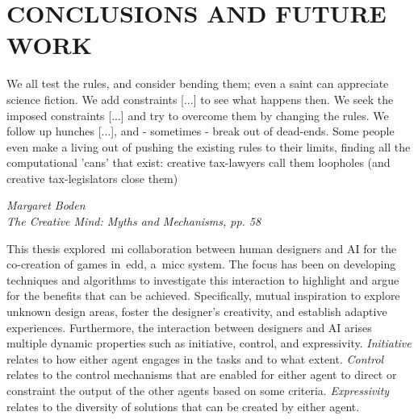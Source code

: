 \section{CONCLUSIONS AND FUTURE WORK} \normalfont


\setlength{\epigraphwidth}{4in} 
\epigraph{We all test the rules, and consider bending them; even a saint can appreciate science fiction. We add constraints [...] to see what happens then. We seek the imposed constraints [...] and try to overcome them by changing the rules. We follow up hunches [...], and - sometimes - break out of dead-ends. Some people even make a living out of pushing the existing rules to their limits, finding all the computational 'cans' that exist: creative tax-lawyers call them loopholes (and creative tax-legislators close them)}{\textit{Margaret Boden \\ The Creative Mind: Myths and Mechanisms, pp. 58}}




This thesis explored~\acrshort{mi} collaboration between human designers and AI for the co-creation of games in~\acrshort{edd}, a~\acrshort{micc} system. The focus has been on developing techniques and algorithms to investigate this interaction to highlight and argue for the benefits that can be achieved. Specifically, mutual inspiration to explore unknown design areas, foster the designer's creativity, and establish adaptive experiences. Furthermore, the interaction between designers and AI arises multiple dynamic properties such as initiative, control, and expressivity. \emph{Initiative} relates to how either agent engages in the tasks and to what extent. \emph{Control} relates to the control mechanisms that are enabled for either agent to direct or constraint the output of the other agents based on some criteria. \emph{Expressivity} relates to the diversity of solutions that can be created by either agent.

